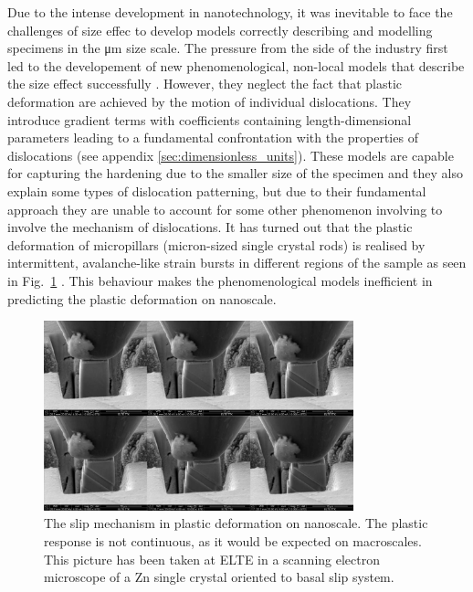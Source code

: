 Due to the intense development in nanotechnology, it was inevitable to face the challenges of size effec to develop models correctly describing and modelling specimens in the \si{\micro\meter} size scale. The pressure from the side of the industry first led to the developement of new phenomenological, non-local models that describe the size effect successfully \cite{FLECK1994475,WalgraefAifantisJournal,WALGRAEF19851365}. However, they neglect the fact that plastic deformation are achieved by the motion of individual dislocations. They introduce gradient terms with coefficients containing length-dimensional parameters leading to a fundamental confrontation with the properties  of dislocations (see appendix \ref{sec:dimensionless_units}). These models are capable for capturing the hardening due to the smaller size of the specimen and they also explain some types of dislocation patterning, but due to their fundamental approach they are unable to account for some other phenomenon involving to involve the mechanism of dislocations. It has turned out that the plastic deformation of micropillars (micron-sized single crystal rods) is realised by intermittent, avalanche-like strain bursts in different regions of the sample as seen in Fig.~\ref{fig:avalanches_EM} \cite{DIMIDUK20054065,Dimiduk1188,Csikor251}. This behaviour makes the phenomenological models inefficient in predicting the plastic deformation on nanoscale.

\begin{figure}[htbp!] 
\centering    
\includegraphics[width=0.8\textwidth]{bazalisZn28840.png}
\caption[Plastic deformation on nanoscale]{The slip mechanism in plastic deformation on nanoscale. The plastic response is not continuous, as it would be expected on macroscales. This picture has been taken at ELTE in a scanning electron microscope of a Zn single crystal oriented to basal slip system.}
\label{fig:avalanches_EM}
\end{figure}

